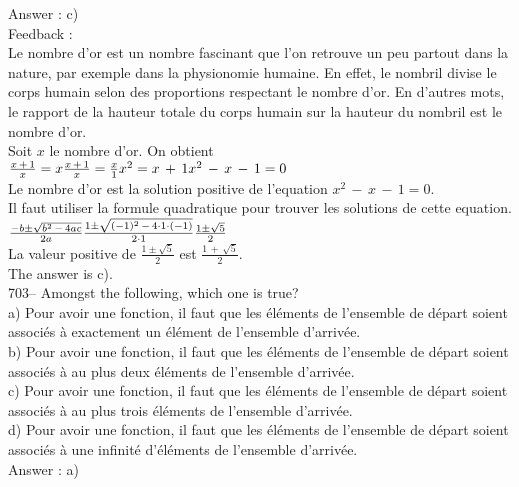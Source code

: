 \documentclass[letterpaper, 12pt]{article}
\begin{document}
Answer : c)\\

Feedback : \\
Le nombre d'or est un nombre fascinant que l'on retrouve un peu partout dans
la nature, par exemple dans la physionomie humaine. En effet, le nombril
divise le corps humain selon des proportions respectant le nombre d'or.  En
d'autres mots, le rapport de la hauteur totale du corps humain sur la
hauteur du nombril est le nombre d'or.\\
Soit $x$ le nombre d'or.  On obtient\\[2mm]
$\frac{x\,+\,1}{x}=x\\[2mm]
\frac{x\,+\,1}{x}=\frac{x}{1}\\[2mm]
x^{2}=x\,+\,1\\[2mm]
x^{2}\,-\,x\,-\,1=0$\\[2mm]
Le nombre d'or est la solution positive de l'equation
$x^{2}\,-\,x\,-\,1=0$.\\
Il faut utiliser la formule quadratique pour trouver les solutions de cette
equation.\\[2mm]
$\frac{-b\pm\sqrt{b^{2}\,-\,4ac}}{2a}\\[2mm]
\frac{1\pm\sqrt{(-1)^{2}\,-\,4\cdot1\cdot(-1)}}{2\cdot1}\\[2mm]
\frac{1\pm\sqrt{5}}{2}$\\[2mm]
La valeur positive de $\frac{1\pm\sqrt{5}}{2}$ est
$\frac{1\,+\,\sqrt{5}}{2}$.\\[2mm]
The answer is c).\\


703-- Amongst the following, which one is true?\\
a) Pour avoir une fonction, il faut que les \'el\'ements de
l'ensemble de d\'epart soient associ\'es \`a exactement un
\'el\'ement de l'ensemble
d'arriv\'ee.\\
b) Pour avoir une fonction, il faut que les \'el\'ements de l'ensemble de
d\'epart soient associ\'es \`a au plus deux \'el\'ements de l'ensemble
d'arriv\'ee.\\
c) Pour avoir une fonction, il faut que les \'el\'ements de l'ensemble de
d\'epart soient associ\'es \`a au plus trois \'el\'ements de l'ensemble
d'arriv\'ee.\\
d) Pour avoir une fonction, il faut que les \'el\'ements de l'ensemble de
d\'epart soient associ\'es \`a une infinit\'e d'\'el\'ements de l'ensemble
d'arriv\'ee.\\

Answer : a)\\
\end{document}
